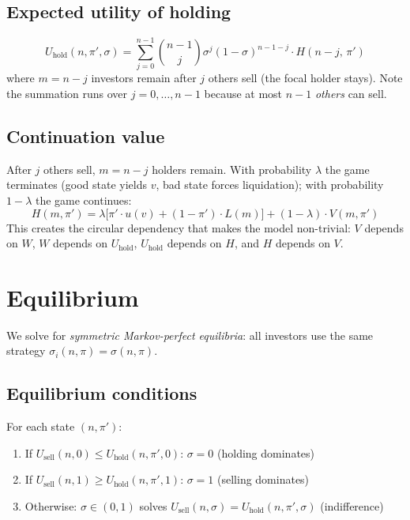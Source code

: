 \documentclass[11pt]{article}
\begin{document}
\subsection{Expected utility of holding}

\begin{equation}
    U_{\text{hold}}(n, \pi', \sigma)
    = \sum_{j=0}^{n-1} \binom{n-1}{j} \sigma^j (1-\sigma)^{n-1-j}
      \cdot H(n{-}j,\, \pi')
    \label{eq:u_hold}
\end{equation}
where $m = n - j$ investors remain after $j$ others sell (the focal holder
stays). Note the summation runs over $j = 0, \ldots, n-1$ because at most
$n-1$ \textit{others} can sell.

\subsection{Continuation value}

After $j$ others sell, $m = n - j$ holders remain. With probability $\lambda$
the game terminates (good state yields $v$, bad state forces liquidation); with
probability $1 - \lambda$ the game continues:
\begin{equation}
    H(m, \pi')
    = \lambda \bigl[\pi' \cdot u(v) + (1-\pi') \cdot L(m)\bigr]
    + (1-\lambda) \cdot V(m, \pi')
    \label{eq:continuation}
\end{equation}
This creates the circular dependency that makes the model non-trivial:
$V$ depends on $W$, $W$ depends on $U_{\text{hold}}$, $U_{\text{hold}}$
depends on $H$, and $H$ depends on $V$.

\section{Equilibrium}

We solve for \textit{symmetric Markov-perfect equilibria}: all investors
use the same strategy $\sigma_i(n,\pi) = \sigma(n,\pi)$.

\subsection{Equilibrium conditions}

For each state $(n, \pi')$:
\begin{enumerate}
    \item If $U_{\text{sell}}(n, 0) \leq U_{\text{hold}}(n, \pi', 0)$:
          $\sigma = 0$ \quad (holding dominates)
    \item If $U_{\text{sell}}(n, 1) \geq U_{\text{hold}}(n, \pi', 1)$:
          $\sigma = 1$ \quad (selling dominates)
    \item Otherwise: $\sigma \in (0,1)$ solves
          $U_{\text{sell}}(n, \sigma) = U_{\text{hold}}(n, \pi', \sigma)$
          \quad (indifference)
\end{enumerate}
\end{document}
